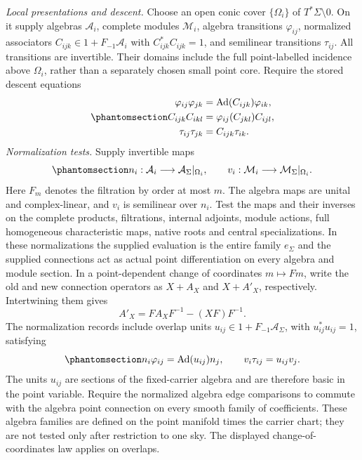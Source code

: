 \documentclass[
  english,
  11pt,
  reqno]{amsart}
\begin{document}
\emph{Local presentations and descent.} Choose an open conic cover
\(\{\Omega_i\}\) of \(T^*\Sigma\setminus0\). On it supply algebras
\(\mathcal A_i\), complete modules \(\mathcal M_i\), algebra transitions
\(\varphi_{ij}\), normalized associators
\(C_{ijk}\in1+F_{-1}\mathcal A_i\) with \(C_{ijk}^*C_{ijk}=1\), and
semilinear transitions \(\tau_{ij}\). All transitions are invertible.
Their domains include the full point-labelled incidence above
\(\Omega_i\), rather than a separately chosen small point core. Require
the stored descent equations
\begin{equation}\protect\phantomsection\label{eq:global-stored-source-descent}{
\begin{aligned}
\varphi_{ij}\varphi_{jk}
 &=\operatorname{Ad}(C_{ijk})\varphi_{ik},\\
C_{ijk}C_{ikl}
 &=\varphi_{ij}(C_{jkl})C_{ijl},\\
\tau_{ij}\tau_{jk}&=C_{ijk}\tau_{ik}.
\end{aligned}
}\end{equation} \emph{Normalization tests.} Supply invertible maps
\begin{equation}\protect\phantomsection\label{eq:global-stored-normalization-vertices}{
n_i:\mathcal A_i\longrightarrow\mathcal A_\Sigma|_{\Omega_i},
\qquad
v_i:\mathcal M_i\longrightarrow\mathcal M_\Sigma|_{\Omega_i}.
}\end{equation} Here \(F_m\) denotes the filtration by order at most
\(m\). The algebra maps are unital and complex-linear, and \(v_i\) is
semilinear over \(n_i\). Test the maps and their inverses on the
complete products, filtrations, internal adjoints, module actions, full
homogeneous characteristic maps, native roots and central
specializations. In these normalizations the supplied evaluation is the
entire family \(e_\Sigma\) and the supplied connections act as actual
point differentiation on every algebra and module section. In a
point-dependent change of coordinates \(m\mapsto Fm\), write the old and
new connection operators as \(X+A_X\) and \(X+A'_X\), respectively.
Intertwining them gives \[
A'_X=F A_XF^{-1}-(XF)F^{-1}.
\] The normalization records include overlap units
\(u_{ij}\in1+F_{-1}\mathcal A_\Sigma\), with \(u_{ij}^*u_{ij}=1\),
satisfying
\begin{equation}\protect\phantomsection\label{eq:global-stored-normalization-edges}{
n_i\varphi_{ij}=\operatorname{Ad}(u_{ij})n_j,
\qquad
v_i\tau_{ij}=u_{ij}v_j.
}\end{equation} The units \(u_{ij}\) are sections of the fixed-carrier
algebra and are therefore basic in the point variable. Require the
normalized algebra edge comparisons to commute with the algebra point
connection on every smooth family of coefficients. These algebra
families are defined on the point manifold times the carrier chart; they
are not tested only after restriction to one sky. The displayed
change-of-coordinates law applies on overlaps.
\end{document}
